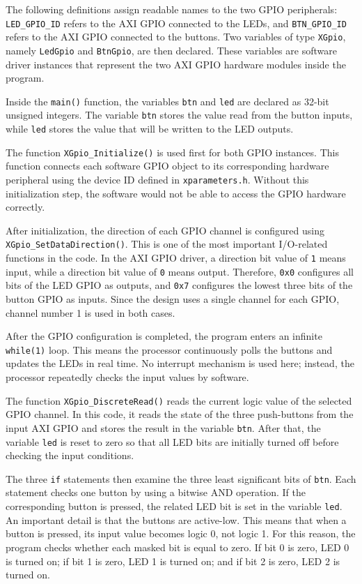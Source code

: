 \documentclass{article}
\begin{document}
The following definitions assign readable names to the two GPIO peripherals:
\texttt{LED\_GPIO\_ID} refers to the AXI GPIO connected to the LEDs, and \texttt{BTN\_GPIO\_ID} refers to the AXI GPIO connected to the buttons. Two variables of type \texttt{XGpio}, namely \texttt{LedGpio} and \texttt{BtnGpio}, are then declared. These variables are software driver instances that represent the two AXI GPIO hardware modules inside the program.

Inside the \texttt{main()} function, the variables \texttt{btn} and \texttt{led} are declared as 32-bit unsigned integers. The variable \texttt{btn} stores the value read from the button inputs, while \texttt{led} stores the value that will be written to the LED outputs.

The function \texttt{XGpio\_Initialize()} is used first for both GPIO instances. This function connects each software GPIO object to its corresponding hardware peripheral using the device ID defined in \texttt{xparameters.h}. Without this initialization step, the software would not be able to access the GPIO hardware correctly.

After initialization, the direction of each GPIO channel is configured using \texttt{XGpio\_SetDataDirection()}. This is one of the most important I/O-related functions in the code. In the AXI GPIO driver, a direction bit value of \texttt{1} means input, while a direction bit value of \texttt{0} means output. Therefore, \texttt{0x0} configures all bits of the LED GPIO as outputs, and \texttt{0x7} configures the lowest three bits of the button GPIO as inputs. Since the design uses a single channel for each GPIO, channel number 1 is used in both cases.

After the GPIO configuration is completed, the program enters an infinite \texttt{while(1)} loop. This means the processor continuously polls the buttons and updates the LEDs in real time. No interrupt mechanism is used here; instead, the processor repeatedly checks the input values by software.

The function \texttt{XGpio\_DiscreteRead()} reads the current logic value of the selected GPIO channel. In this code, it reads the state of the three push-buttons from the input AXI GPIO and stores the result in the variable \texttt{btn}. After that, the variable \texttt{led} is reset to zero so that all LED bits are initially turned off before checking the input conditions.

The three \texttt{if} statements then examine the three least significant bits of \texttt{btn}. Each statement checks one button by using a bitwise AND operation. If the corresponding button is pressed, the related LED bit is set in the variable \texttt{led}. An important detail is that the buttons are active-low. This means that when a button is pressed, its input value becomes logic 0, not logic 1. For this reason, the program checks whether each masked bit is equal to zero. If bit 0 is zero, LED 0 is turned on; if bit 1 is zero, LED 1 is turned on; and if bit 2 is zero, LED 2 is turned on.
\end{document}

